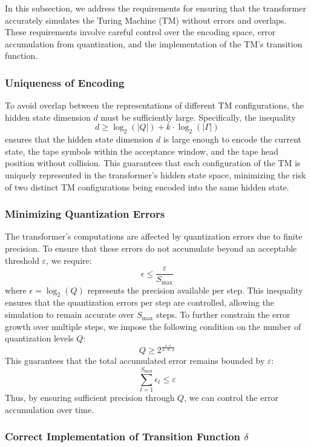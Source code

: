 In this subsection, we address the requirements for ensuring that the transformer accurately simulates the Turing Machine (TM) without errors and overlaps. These requirements involve careful control over the encoding space, error accumulation from quantization, and the implementation of the TM’s transition function.

\subsubsection{Uniqueness of Encoding}\label{Appendix d}

To avoid overlap between the representations of different TM configurations, the hidden state dimension \( d \) must be sufficiently large. Specifically, the inequality
\[
d \geq \log_2(|Q|) + k \cdot \log_2(|\Gamma|)
\]
ensures that the hidden state dimension \( d \) is large enough to encode the current state, the tape symbols within the acceptance window, and the tape head position without collision. This guarantees that each configuration of the TM is uniquely represented in the transformer's hidden state space, minimizing the risk of two distinct TM configurations being encoded into the same hidden state.

\subsubsection{Minimizing Quantization Errors}

The transformer’s computations are affected by quantization errors due to finite precision. To ensure that these errors do not accumulate beyond an acceptable threshold \( \varepsilon \), we require:
\[
\epsilon \leq \frac{\varepsilon}{S_{\text{max}}}
\]
where \( \epsilon = \log_2(Q) \) represents the precision available per step. This inequality ensures that the quantization errors per step are controlled, allowing the simulation to remain accurate over \( S_{\text{max}} \) steps.
To further constrain the error growth over multiple steps, we impose the following condition on the number of quantization levels \( Q \):
\[
Q \geq 2^{\frac{\varepsilon \cdot \epsilon}{L \cdot d \cdot k}}
\]
This guarantees that the total accumulated error remains bounded by \( \varepsilon \):
\[
\sum_{t=1}^{S_{\text{max}}} \epsilon_t \leq \varepsilon
\]
Thus, by ensuring sufficient precision through \( Q \), we can control the error accumulation over time.

\subsubsection{Correct Implementation of Transition Function \( \delta \)}


